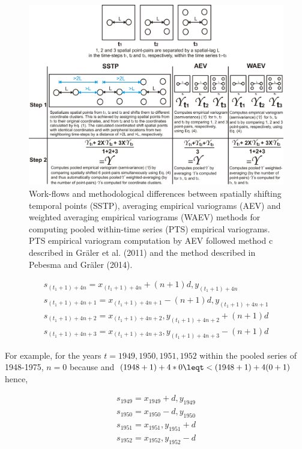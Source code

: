 \begin{figure}[t]
  \centering
  \includegraphics[width=\textwidth]{Figures/Fig_3_1.png}
  \caption{Work-flows and methodological differences between spatially shifting temporal points (SSTP), averaging empirical variograms (AEV) and weighted averaging empirical variograms (WAEV) methods for computing pooled within-time series (PTS) empirical variograms. PTS empirical variogram computation by AEV followed method c described in Gräler et al. (2011) and the method described in Pebesma and Gräler (2014).}
  \label{Fig_3_1}
\end{figure}

\begin{equation}
\begin{split}
s_{(t_1+1)+4n} = x_{(t_1+1)+4n}+(n+1)d, y_{(t_1+1)+4n} \\
s_{(t_1+1)+4n+1} = x_{(t_1+1)+4n+1}-(n+1)d, y_{(t_1+1)+4n+1} \\
s_{(t_1+1)+4n+2} = x_{(t_1+1)+4n+2}, y_{(t_1+1)+4n+2}+(n+1)d \\
s_{(t_1+1)+4n+3} = x_{(t_1+1)+4n+3}, y_{(t_1+1)+4n+3}-(n+1)d
\end{split}
\end{equation}

For example, for the years $t = {1949, 1950, 1951, 1952}$ within the pooled series of 1948-1975, $n = 0$ because   and $(1948+1)+4*0\leqt<(1948+1)+4(0+1)$ hence,

\begin{equation}
\begin{split}
s_{1949} = x_{1949}+d, y_{1949} \\
s_{1950} = x_{1950}-d, y_{1950} \\
s_{1951} = x_{1951}, y_{1951}+d \\
s_{1952} = x_{1952}, y_{1952}-d
\end{split}
\end{equation}

